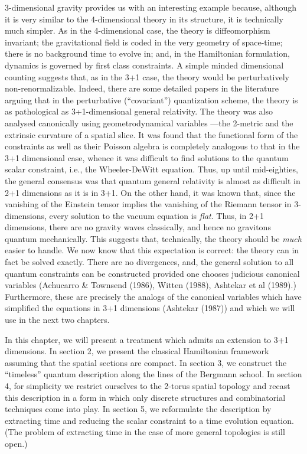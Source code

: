 3-dimensional gravity provides us with an interesting example because,
although it is very similar to the 4-dimensional theory in its structure,
it is technically much simpler. As in the 4-dimensional case, the theory
is diffeomorphism invariant; the gravitational field is coded in the very
geometry of space-time; there is no background time to evolve in; and, in
the Hamiltonian formulation, dynamics is governed by first class constraints.
A simple minded dimensional counting suggests that, as in the 3+1 case, the
theory would be perturbatively non-renormalizable. Indeed, there are some
detailed papers in the literature arguing that in the perturbative
(``covariant'') quantization scheme, the theory is as pathological as
3+1-dimensional general relativity. The theory was also analysed canonically
using geometrodynamical variables ---the 2-metric and the extrinsic curvature
of a spatial slice. It was found that the functional form of the constraints
as well as their Poisson algebra is completely analogous to that in the
3+1 dimensional case, whence it was difficult to find solutions to the
quantum scalar constraint, i.e., the Wheeler-DeWitt equation. Thus, up until
mid-eighties, the general consensus was that quantum general relativity is
almost as difficult in 2+1 dimensions as it is in 3+1. On the other hand, it
was known that, since the vanishing of the Einstein tensor implies the
vanishing of the Riemann tensor in 3-dimensions, every solution to the vacuum
equation is {\it flat}. Thus, in 2+1 dimensions, there are no gravity waves
classically, and hence no gravitons quantum mechanically. This suggests that,
technically, the theory should be {\it much} easier to handle. We now know that
this expectation is correct: the theory can in fact be solved exactly. There
are no divergences, and, the general solution to all quantum constraints can be
constructed provided one chooses judicious canonical variables (Achucarro
\& Townsend (1986), Witten (1988), Ashtekar et al (1989).) Furthermore, these
are precisely the analogs of the canonical variables which have simplified
the equations in 3+1 dimensions (Ashtekar (1987)) and which we will use in the
next two chapters.

In this chapter, we will present a treatment which admits an extension to
3+1 dimensions. In section 2, we present the classical Hamiltonian framework
assuming that the spatial sections are compact. In section 3, we construct the
``timeless'' quantum description along the lines of the Bergmann school. In
section 4, for simplicity we restrict ourselves to the 2-torus spatial
topology and recast this description in a form in which only discrete
structures and combinatorial techniques come into play. In section 5, we
reformulate the description by extracting time and reducing the scalar
constraint to a time evolution equation. (The problem of extracting
time in the case of more general topologies is still open.)

